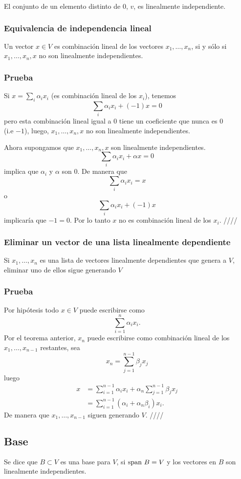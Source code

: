 \documentclass{article}
\begin{document}
El conjunto de un elemento distinto de $0$, $v$, es linealmente independiente.

\newpage
\subsubsection{Equivalencia de independencia lineal}\label{dependencia}
Un vector $x\in V$ es combinación lineal de los vectores
$x_1,\ldots,x_n$, si y sólo si $x_1,\ldots,x_n,x$ no son linealmente
independientes.
\subsubsection*{Prueba}
Si $x=\sum_i \alpha_i x_i$ (es combinación lineal de los $x_i$), tenemos
$$\sum_i \alpha_i x_i +(-1)x = 0$$
pero esta combinación lineal igual a $0$ tiene un coeficiente que
nunca es $0$\\
(i.e $-1$), luego, $x_1,\ldots,x_n,x$ no son linealmente
independientes.

Ahora supongamos que $x_1,\ldots,x_n,x$ son linealmente independientes.
$$\sum_i \alpha_i x_i + \alpha x = 0$$
implica que $\alpha_i$ y $\alpha$ son $0$. De manera que
$$\sum_i \alpha_i x_i = x$$
o
$$\sum_i \alpha_i x_i + (-1)x$$
implicaría que $-1=0$. Por lo tanto $x$ no es combinación lineal
de los $x_i$. \hfill ////

\subsubsection{Eliminar un vector de una lista linealmente dependiente}
\label{eliminación}
Si $x_1,\ldots,x_n$ es una lista de vectores linealmente dependientes que genera
a $V$, eliminar uno de ellos sigue generando $V$
\subsubsection*{Prueba}
Por hipótesis todo $x\in V$ puede escribirse como
$$\sum^n_{i=1} \alpha_i x_i.$$
Por el teorema anterior, $x_n$ puede escribirse como
combinación lineal de los $x_1,\ldots,x_{n-1}$ restantes,
sea
$$x_n=\sum^{n-1}_{j=1}\beta_j x_j$$
luego
\begin{align*}
    x&=\sum^{n-1}_{i=1} \alpha_i x_i +
    \alpha_n\sum^{n-1}_{j=1}\beta_j x_j\\
    &=\sum^{n-1}_{i=1}(\alpha_i+\alpha_n\beta_i)x_i.
\end{align*}
De manera que $x_1,\ldots,x_{n-1}$ siguen generando $V$.
\hfill ////

\subsection{Base}
Se dice que $B\subset V$ es una base para $V$, si
$\text{span } B = V$ y los vectores en $B$ son linealmente
independientes.
\end{document}
